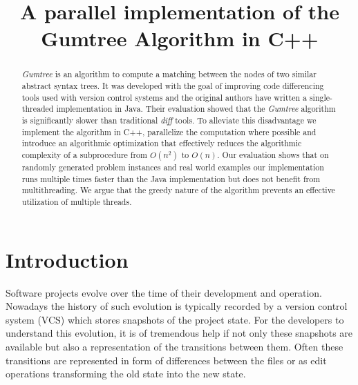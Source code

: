 \documentclass[letterpaper]{article}
\title{A parallel implementation of the Gumtree Algorithm in C++}
\begin{document}
%
\maketitle
%

\begin{abstract}

\emph{Gumtree} is an algorithm to compute a matching between the nodes of two similar abstract syntax trees.
It was developed with the goal of improving code differencing tools used with version control systems and the original authors have written a single-threaded implementation in Java.
Their evaluation showed that the \emph{Gumtree} algorithm is significantly slower than traditional \emph{diff} tools.
To alleviate this disadvantage we implement the algorithm in C++, parallelize the computation where possible and introduce an algorithmic optimization that effectively reduces the algorithmic complexity of a subprocedure  from $O(n^2)$ to $O(n)$.
Our evaluation shows that on randomly generated problem instances and real world examples our implementation runs multiple times faster than the Java implementation but does not benefit from multithreading.
We argue that the greedy nature of the algorithm prevents an effective utilization of multiple threads.
\end{abstract}

\section{Introduction}\label{sec:intro}


Software projects evolve over the time of their development and operation.
Nowadays the history of such evolution is typically recorded by a version control system (VCS) which stores snapshots of the project state.
For the developers to understand this evolution, it is of tremendous help if not only these snapshots are available but also a representation of the transitions between them.
Often these transitions are represented in form of differences between the files or as edit operations transforming the old state into the new state.
\end{document}
